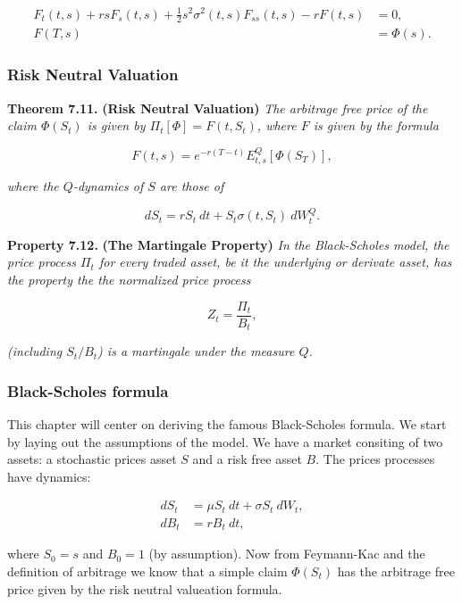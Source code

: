 \documentclass[
]{article}
\begin{document}
\begin{align*}
F_t(t,s)+rsF_s(t,s)+\frac{1}{2}s^2\sigma^2(t,s)F_{ss}(t,s)-rF(t,s)&=0,\\
F(T,s)&=\Phi(s).
\end{align*}

\hypertarget{risk-neutral-valuation-1}{%
\subsubsection{Risk Neutral Valuation}\label{risk-neutral-valuation-1}}

\textbf{Theorem 7.11.} \textbf{(Risk Neutral Valuation)} \emph{The
arbitrage free price of the claim \(\Phi(S_t)\) is given by
\(\Pi_t[\Phi]=F(t,S_t)\), where \(F\) is given by the formula}

\[
F(t,s)=e^{-r(T-t)}E^Q_{t,s}[\Phi(S_T)],\tag{7.43}
\]

\emph{where the \(Q\)-dynamics of \(S\) are those of}

\[
dS_t=rS_t\ dt+S_t\sigma(t,S_t)\ dW_t^Q.\tag{7.42}
\]

\textbf{Property 7.12.} \textbf{(The Martingale Property)} \emph{In the
Black-Scholes model, the price process \(\Pi_t\) for every traded asset,
be it the underlying or derivate asset, has the property the the
normalized price process}

\[
Z_t=\frac{\Pi_t}{B_t},
\]

\emph{(including \(S_t/B_t\)) is a martingale under the measure \(Q\).}

\hypertarget{black-scholes-formula}{%
\subsubsection{Black-Scholes formula}\label{black-scholes-formula}}

This chapter will center on deriving the famous Black-Scholes formula.
We start by laying out the assumptions of the model. We have a market
consiting of two assets: a stochastic prices asset \(S\) and a risk free
asset \(B\). The prices processes have dynamics:

\begin{align*}
dS_t&=\mu S_t\ dt+\sigma S_t\ dW_t,\tag{7.45}\\
dB_t&=r B_t\ dt,\tag{7.44}
\end{align*}

where \(S_0=s\) and \(B_0=1\) (by assumption). Now from Feymann-Kac and
the definition of arbitrage we know that a simple claim \(\Phi(S_t)\)
has the arbitrage free price given by the risk neutral valueation
formula.
\end{document}
